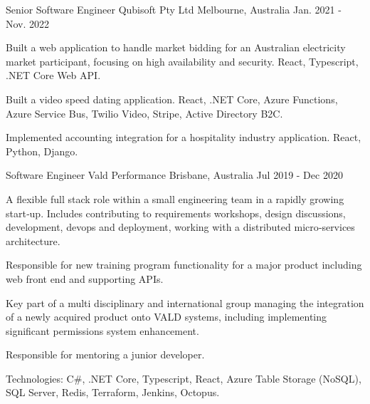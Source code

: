 

\begin{cventries}

\cventry
{Senior Software Engineer} %
{Qubisoft Pty Ltd} %
{Melbourne, Australia} %
{Jan. 2021 - Nov. 2022} %
{
  \begin{cvitems} %
    \item {Built a web application to handle market bidding for an Australian electricity market participant, focusing on high availability and security.  React, Typescript, .NET Core Web API.}
    \item {Built a video speed dating application.  React, .NET Core, Azure Functions, Azure Service Bus, Twilio Video, Stripe, Active Directory B2C.}
    \item {Implemented accounting integration for a hospitality industry application.  React, Python, Django.}
  \end{cvitems}
}

\cventry
{Software Engineer} %
{Vald Performance} %
{Brisbane, Australia} %
{Jul 2019 - Dec 2020} %
{
  \begin{cvitems} %
    \item {A flexible full stack role within a small engineering team in a rapidly growing start‑up. Includes contributing to requirements workshops, design discussions, development, devops and deployment, working with a distributed micro‑services architecture.}
    \item {Responsible for new training program functionality for a major product including web front end and supporting APIs.}
    \item {Key part of a multi disciplinary and international group managing the integration of a newly acquired product onto VALD systems, including implementing significant permissions system enhancement.}
    \item {Responsible for mentoring a junior developer.}
    \item {Technologies: C\#, .NET Core, Typescript, React, Azure Table Storage (NoSQL), SQL Server, Redis, Terraform, Jenkins, Octopus.}
  \end{cvitems}
}


\end{cventries}
